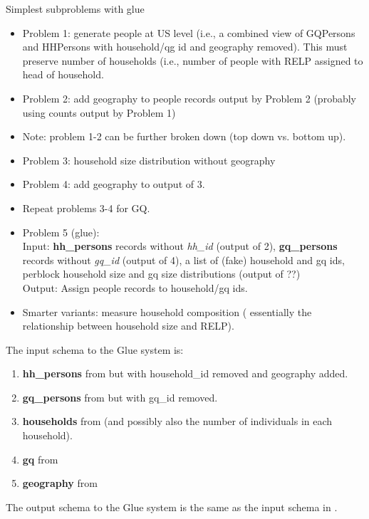 \documentclass{amsart}
\begin{document}
{Simplest subproblems with glue
\begin{itemize}
\item Problem 1: generate people at US level (i.e., a combined view of GQPersons and HHPersons with household/qg id and geography removed).  This must preserve number of households (i.e., number of people with RELP assigned to head of household. %
\item Problem 2: add geography to people records output by Problem 2 (probably using counts output by Problem 1)
\item Note: problem 1-2 can be further broken down (top down vs. bottom up).
\item Problem 3: household size distribution without geography
\item Problem 4: add geography to output of 3.  
\item Repeat problems 3-4 for GQ.
\item Problem 5 (glue): \\
Input: \textbf{hh\_persons} records without \emph{hh\_id} (output of 2), \textbf{gq\_persons} records without \emph{gq\_id} (output of 4), a list of (fake) household and gq ids, perblock household size and gq size distributions (output of ??)\\
Output: Assign people records to household/gq ids. 
\item Smarter variants: measure household composition ( essentially the relationship between household size and RELP).
\end{itemize}

The input schema to the Glue system is:
\begin{enumerate}
\item \textbf{hh\_persons} from  but with household\_id removed and geography added.
\item \textbf{gq\_persons} from  but with gq\_id removed.
\item \textbf{households} from  (and possibly also the number of individuals in each household).
\item \textbf{gq} from 
\item \textbf{geography} from 
\end{enumerate}
The output schema to the Glue system is the same as the input schema in . 

}
\end{document}
